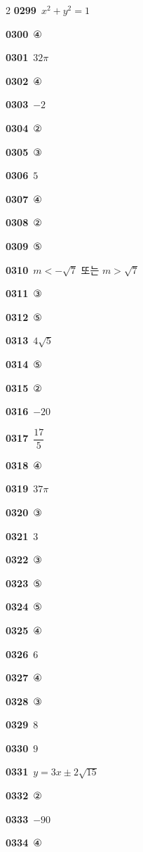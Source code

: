 \documentclass[10pt,a4paper]{article}
\begin{document}
\begin{multicols}{2}
\noindent\textbf{0299}\ $x^2+y^2=1$\par
\noindent\textbf{0300}\ ④\par
\noindent\textbf{0301}\ $32\pi$\par
\noindent\textbf{0302}\ ④\par
\noindent\textbf{0303}\ $-2$\par
\noindent\textbf{0304}\ ②\par
\noindent\textbf{0305}\ ③\par
\noindent\textbf{0306}\ $5$\par
\noindent\textbf{0307}\ ④\par
\noindent\textbf{0308}\ ②\par
\noindent\textbf{0309}\ ⑤\par
\noindent\textbf{0310}\ $m<-\sqrt{7}$ 또는 $m>\sqrt{7}$\par
\noindent\textbf{0311}\ ③\par
\noindent\textbf{0312}\ ⑤\par
\noindent\textbf{0313}\ $4\sqrt{5}$\par
\noindent\textbf{0314}\ ⑤\par
\noindent\textbf{0315}\ ②\par
\noindent\textbf{0316}\ $-20$\par
\noindent\textbf{0317}\ $\dfrac{17}{5}$\par
\noindent\textbf{0318}\ ④\par
\noindent\textbf{0319}\ $37\pi$\par
\noindent\textbf{0320}\ ③\par
\noindent\textbf{0321}\ $3$\par
\noindent\textbf{0322}\ ③\par
\noindent\textbf{0323}\ ⑤\par
\noindent\textbf{0324}\ ⑤\par
\noindent\textbf{0325}\ ④\par
\noindent\textbf{0326}\ $6$\par
\noindent\textbf{0327}\ ④\par
\noindent\textbf{0328}\ ③\par
\noindent\textbf{0329}\ $8$\par
\noindent\textbf{0330}\ $9$\par
\noindent\textbf{0331}\ $y=3x\pm2\sqrt{15}$\par
\noindent\textbf{0332}\ ②\par
\noindent\textbf{0333}\ $-90$\par
\noindent\textbf{0334}\ ④\par

\end{multicols}
\end{document}
